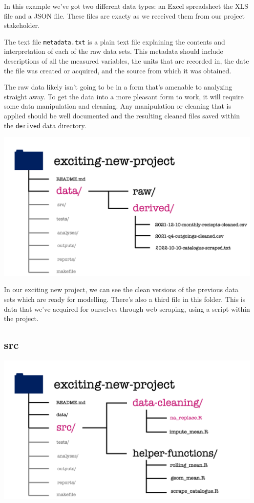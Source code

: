 \documentclass[
  12pt,
]{book}
\begin{document}
In this example we've got two different data types: an Excel spreadsheet the XLS file and a JSON file. These files are exacty as we received them from our project stakeholder.

The text file \texttt{metadata.txt} is a plain text file explaining the contents and interpretation of each of the raw data sets. This metadata should include descriptions of all the measured variables, the units that are recorded in, the date the file was created or acquired, and the source from which it was obtained.

The raw data likely isn't going to be in a form that's amenable to analyzing straight away. To get the data into a more pleasant form to work, it will require some data manipulation and cleaning. Any manipulation or cleaning that is applied should be well documented and the resulting cleaned files saved within the \texttt{derived} data directory.

\includegraphics[width=0.8\linewidth]{images/101-workflows-organising-your-work/directory-structure-drawings/directory-structure-drawing-12}

In our exciting new project, we can see the clean versions of the previous data sets which are ready for modelling. There's also a third file in this folder. This is data that we've acquired for ourselves through web scraping, using a script within the project.

\hypertarget{src}{%
\subsection{src}\label{src}}

\includegraphics[width=0.8\linewidth]{images/101-workflows-organising-your-work/directory-structure-drawings/directory-structure-drawing-16}
\end{document}
